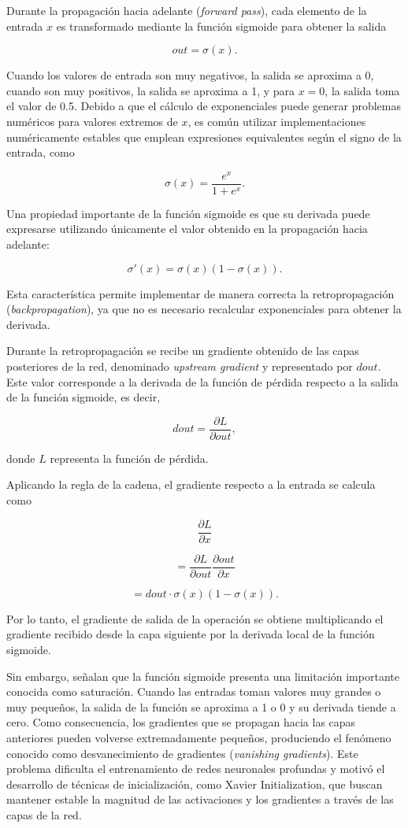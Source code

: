 \documentclass[12pt]{article}
\begin{document}
Durante la propagación hacia adelante (\textit{forward pass}), cada elemento de la entrada $x$
es transformado mediante la función sigmoide para obtener la salida

$$
out=\sigma(x).
$$

Cuando los valores de entrada son muy negativos, la salida se aproxima a 0, cuando son muy positivos, 
la salida se aproxima a 1, y para $x=0$, la salida toma el valor de 0.5. Debido a que el cálculo de exponenciales 
puede generar problemas numéricos para valores extremos de $x$, es común utilizar implementaciones numéricamente 
estables que emplean expresiones equivalentes según el signo de la entrada, como

$$
\sigma(x)=\frac{e^x}{1+e^{x}}.
$$

Una propiedad importante de la función sigmoide es que su derivada puede expresarse 
utilizando únicamente el valor obtenido en la propagación hacia adelante:

$$
\sigma'(x)=\sigma(x)(1-\sigma(x)).
$$

Esta característica permite implementar de manera correcta la retropropagación (\textit{backpropagation}), 
ya que no es necesario recalcular exponenciales para obtener la derivada.

Durante la retropropagación se recibe un gradiente obtenido de las capas posteriores de la red, 
denominado \textit{upstream gradient} y representado por $dout$. Este valor corresponde a la derivada de 
la función de pérdida respecto a la salida de la función sigmoide, es decir,

$$
dout=\frac{\partial L}{\partial out},
$$

donde $L$ representa la función de pérdida.

Aplicando la regla de la cadena, el gradiente respecto a la entrada se calcula como

$$
\frac{\partial L}{\partial x}
$$

$$
=\frac{\partial L}{\partial out} \frac{\partial out}{\partial x}
$$

$$=dout \cdot \sigma(x)(1-\sigma(x)).$$

Por lo tanto, el gradiente de salida de la operación se obtiene multiplicando el 
gradiente recibido desde la capa siguiente por la derivada local de la función sigmoide.

Sin embargo, \textcite{GLOROT2010} señalan que la función sigmoide presenta una 
limitación importante conocida como saturación. Cuando las entradas toman valores muy 
grandes o muy pequeños, la salida de la función se aproxima a 1 o 0 y su derivada tiende a cero. 
Como consecuencia, los gradientes que se propagan hacia las capas anteriores pueden volverse extremadamente 
pequeños, produciendo el fenómeno conocido como desvanecimiento de gradientes (\textit{vanishing gradients}). 
Este problema dificulta el entrenamiento de redes neuronales profundas y motivó el desarrollo de técnicas de 
inicialización, como Xavier Initialization, que buscan mantener estable la magnitud de las activaciones y 
los gradientes a través de las capas de la red.
\end{document}
